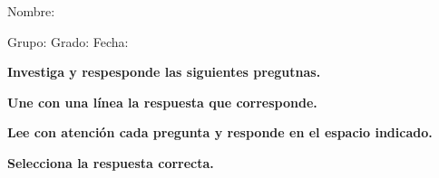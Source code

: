 \documentclass[10pt,addpoints]{exam}
\begin{document}
Nombre:\enspace\hrulefill

\vspace{5mm}

Grupo:\enspace\hrulefill
\enspace{}Grado:\enspace\hrulefill
\enspace{}Fecha:\enspace\hrulefill

\begin{questions}

\begin{EnvFullwidth}
  \sffamily\textbf{Investiga y respesponde las siguientes pregutnas.}
\end{EnvFullwidth}


\vspace{2cm}

\vspace{2cm}

\vspace{2cm}

\vspace{2cm}

\vspace{2cm}


\newpage


\vspace{4cm}

\vspace{4cm}


\begin{EnvFullwidth}
  \sffamily\textbf{Une con una línea la respuesta que corresponde.}
\end{EnvFullwidth}



\begin{EnvFullwidth}
  \sffamily\textbf{Lee con atención cada pregunta y responde en
  el espacio indicado. }
\end{EnvFullwidth}


\vspace{\baselineskip}


\vspace{\baselineskip}



\vspace{\baselineskip}




\begin{EnvFullwidth}
  \sffamily\textbf{Selecciona la respuesta correcta. }
\end{EnvFullwidth}

\vspace{\baselineskip}

\vspace{\baselineskip}





\newpage



\newpage




\end{questions}
\end{document}
